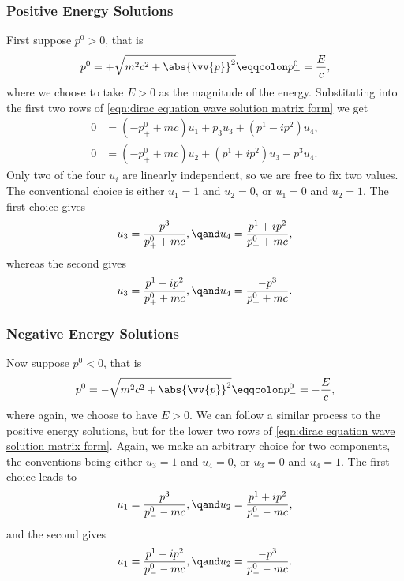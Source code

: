 \subsubsection{Positive Energy Solutions}
First suppose \(p^0 > 0\), that is
\begin{equation}
    p^0 = +\sqrt{m^2c^2 + \abs{\vv{p}}^2} \eqqcolon p^0_+ = \frac{E}{c},
\end{equation}
where we choose to take \(E > 0\) as the magnitude of the energy.
Substituting into the first two rows of \cref{eqn:dirac equation wave solution matrix form} we get
\begin{align}
    0 &= (-p_+^0 + mc)u_1 + p_3u_3 + (p^1 - ip^2)u_4,\\
    0 &= (-p_+^0 + mc)u_2 + (p^1 + ip^2)u_3 - p^3 u_4.
\end{align}
Only two of the four \(u_i\) are linearly independent, so we are free to fix two values.
The conventional choice is either \(u_1 = 1\) and \(u_2 = 0\), or \(u_1 = 0\) and \(u_2 = 1\).
The first choice gives
\begin{equation}
    u_3 = \frac{p^3}{p_+^0 + mc}, \qand u_4 = \frac{p^1 + ip^2}{p_+^0 + mc},
\end{equation}
whereas the second gives
\begin{equation}
    u_3 = \frac{p^1 - ip^2}{p_+^0 + mc}, \qand u_4 = \frac{-p^3}{p_+^0 + mc}.
\end{equation}

\subsubsection{Negative Energy Solutions}
Now suppose \(p^0 < 0\), that is
\begin{equation}
    p^0 = -\sqrt{m^2c^2 + \abs{\vv{p}}^2} \eqqcolon p^0_- = -\frac{E}{c},
\end{equation}
where again, we choose to have \(E > 0\).
We can follow a similar process to the positive energy solutions, but for the lower two rows of \cref{eqn:dirac equation wave solution matrix form}.
Again, we make an arbitrary choice for two components, the conventions being either \(u_3 = 1\) and \(u_4 = 0\), or \(u_3 = 0\) and \(u_4 = 1\).
The first choice leads to 
\begin{equation}
    u_1 = \frac{p^3}{p^0_- - mc}, \qand u_2 = \frac{p^1 + ip^2}{p^0_- - mc},
\end{equation}
and the second gives
\begin{equation}
    u_1 = \frac{p^1 - ip^2}{p^0_- - mc}, \qand u_2 = \frac{-p^3}{p^0_- - mc}.
\end{equation}

